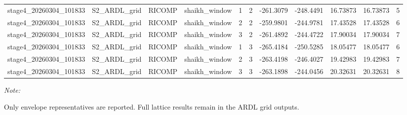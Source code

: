\begin{table}[!h]
\begin{threeparttable}
\begin{tabular}[t]{llllrrrrrrr}
stage4\_20260304\_101833 & S2\_ARDL\_grid & RICOMP & shaikh\_window & 1 & 2 & -261.3079 & -248.4491 & 16.73873 & 16.73873 & 5\\
stage4\_20260304\_101833 & S2\_ARDL\_grid & RICOMP & shaikh\_window & 2 & 2 & -259.9801 & -244.9781 & 17.43528 & 17.43528 & 6\\
\addlinespace
stage4\_20260304\_101833 & S2\_ARDL\_grid & RICOMP & shaikh\_window & 3 & 2 & -261.4892 & -244.4722 & 17.90034 & 17.90034 & 7\\
stage4\_20260304\_101833 & S2\_ARDL\_grid & RICOMP & shaikh\_window & 1 & 3 & -265.4184 & -250.5285 & 18.05477 & 18.05477 & 6\\
stage4\_20260304\_101833 & S2\_ARDL\_grid & RICOMP & shaikh\_window & 2 & 3 & -263.4198 & -246.4027 & 19.42983 & 19.42983 & 7\\
stage4\_20260304\_101833 & S2\_ARDL\_grid & RICOMP & shaikh\_window & 3 & 3 & -263.1898 & -244.0456 & 20.32631 & 20.32631 & 8\\
\bottomrule
\end{tabular}
\begin{tablenotes}
\item \textit{Note: } 
\item Only envelope representatives are reported. Full lattice results remain in the ARDL grid outputs.
\end{tablenotes}
\end{threeparttable}
\end{table}
